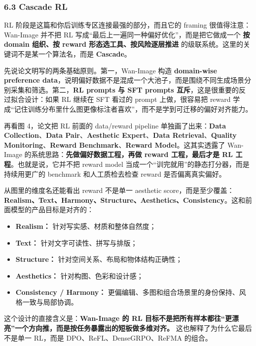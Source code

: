 \subsubsection{6.3 Cascade RL}

RL 阶段是这篇和你后训练专区连接最强的部分，而且它的 framing 很值得注意：Wan-Image 并不把 RL 写成“最后上一遍同一种偏好优化”，而是把它做成一个 \textbf{按 domain 组织、按 reward 形态选工具、按风险逐层推进} 的级联系统。这里的关键词不是某一个算法名，而是 \textbf{Cascade}。

先说论文明写的两条基础原则。第一，Wan-Image 构造 \textbf{domain-wise preference data}，说明偏好数据不是混成一个大池子，而是围绕不同生成场景分别采集和筛选。第二，\textbf{RL prompts 与 SFT prompts 互斥}，这是很重要的反过拟合设计：如果 RL 继续在 SFT 看过的 prompt 上做，很容易把 reward 学成“记住训练分布里什么图更像标注者喜欢”，而不是学到可迁移的偏好对齐能力。

再看图 4，论文把 RL 前面的 data/reward pipeline 单独画了出来：\textbf{Data Collection}、\textbf{Data Pair}、\textbf{Aesthetic Expert}、\textbf{Data Retrieval}、\textbf{Quality Monitoring}、\textbf{Reward Benchmark}、\textbf{Reward Model}。这其实透露了 Wan-Image 的系统思路：\textbf{先做偏好数据工程，再做 reward 工程，最后才是 RL 工程}。也就是说，它并不把 reward model 当成一个“训完就用”的静态打分器，而是持续用更广的 benchmark 和人工质检去检查 reward 是否偏离真实偏好。

从图里的维度名还能看出 reward 不是单一 aesthetic score，而是至少覆盖：\textbf{Realism、Text、Harmony、Structure、Aesthetics、Consistency}。这和前面模型的产品目标是对齐的：

\begin{itemize}[leftmargin=1.5em]
  \item \textbf{Realism：} 针对写实感、材质和整体自然度；
  \item \textbf{Text：} 针对文字可读性、拼写与排版；
  \item \textbf{Structure：} 针对空间关系、布局和物体结构正确性；
  \item \textbf{Aesthetics：} 针对构图、色彩和设计感；
  \item \textbf{Consistency / Harmony：} 更偏编辑、多图和组合场景里的身份保持、风格一致与局部协调。
\end{itemize}

这个设计的直接含义是：\textbf{Wan-Image 的 RL 目标不是把所有样本都往“更漂亮”一个方向推，而是按任务暴露出的短板做多维对齐。} 这也解释了为什么它最后不是单一 RL，而是 DPO、ReFL、DenseGRPO、ReFMA 的组合。

